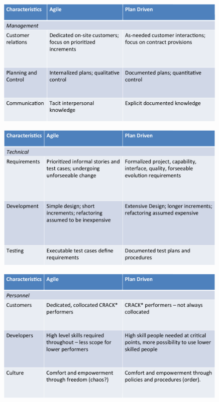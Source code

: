 \documentclass[a4paper]{article}
\begin{document}
\begin{figure}[H]
\begin{center} 
    \includegraphics[scale=0.3]{images/AgileTable2.pdf}
\end{center}
\end{figure}

\begin{figure}[H]
\begin{center} 
    \includegraphics[scale=0.3]{images/AgileTable3.pdf}
\end{center}
\end{figure}

\begin{figure}[H]
\begin{center} 
    \includegraphics[scale=0.3]{images/AgileTable4.pdf}
\end{center}
\end{figure}
\end{document}
